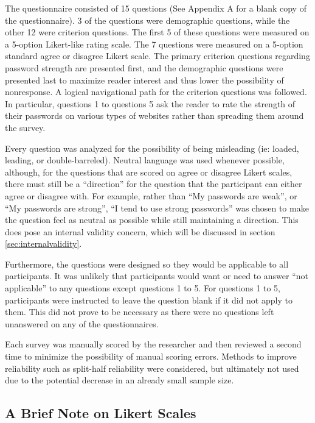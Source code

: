 \documentclass[letterpaper, 10 pt, conference]{ieeeconf}  %
\begin{document}
The questionnaire consisted of 15 questions (See Appendix A for a blank copy of the questionnaire). 3 of the questions were demographic questions, while the other 12 were criterion questions. The first 5 of these questions were measured on a 5-option Likert-like rating scale. The 7 questions were measured on a 5-option standard agree or disagree Likert scale.  The primary criterion questions regarding password strength are presented first, and the demographic questions were presented last to maximize reader interest and thus lower the possibility of nonresponse. A logical navigational path for the criterion questions was followed. In particular, questions 1 to questions 5 ask the reader to rate the strength of their passwords on various types of websites rather than spreading them around the survey.

Every question was analyzed for the possibility of being misleading (ie: loaded, leading, or double-barreled). Neutral language was used whenever possible, although, for the questions that are scored on agree or disagree Likert scales, there must still be a “direction” for the question that the participant can either agree or disagree with. For example, rather than “My passwords are weak”, or “My passwords are strong”, “I tend to use strong passwords” was chosen to make the question feel as neutral as possible while still maintaining a direction. This does pose an internal validity concern, which will be discussed in section \ref{sec:internalvalidity}.

Furthermore, the questions were designed so they would be applicable to all participants. It was unlikely that participants would want or need to answer “not applicable” to any questions except questions 1 to 5. For questions 1 to 5, participants were instructed to leave the question blank if it did not apply to them. This did not prove to be necessary as there were no questions left unanswered on any of the questionnaires.  

Each survey was manually scored by the researcher and then reviewed a second time to minimize the possibility of manual scoring errors. Methods to improve reliability such as split-half reliability were considered, but ultimately not used due to the potential decrease in an already small sample size.

\subsection{A Brief Note on Likert Scales}
\end{document}
